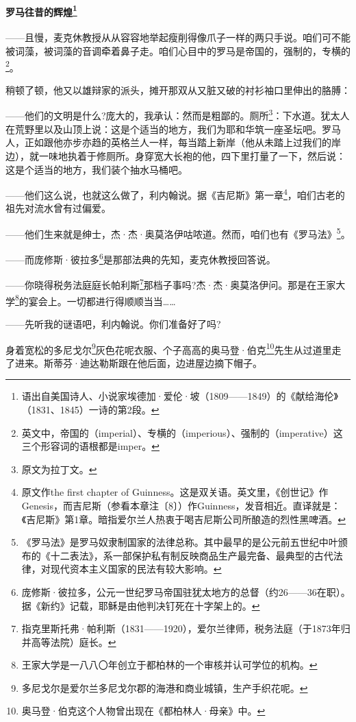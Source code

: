 \paragraph*{罗马往昔的辉煌\footnote{语出自美国诗人、小说家埃德加·爱伦·坡（1809——1849）的《献给海伦》（1831、1845）一诗的第2段。}}
\par ——且慢，麦克休教授从从容容地举起瘦削得像爪子一样的两只手说。咱们可不能被词藻，被词藻的音调牵着鼻子走。咱们心目中的罗马是帝国的，强制的，专横的\footnote{英文中，帝国的（imperial）、专横的（imperious）、强制的（imperative）这三个形容词的语根都是imper。}。
\par 稍顿了顿，他又以雄辩家的派头，摊开那双从又脏又破的衬衫袖口里伸出的胳膊：
\par ——他们的文明是什么?庞大的，我承认：然而是粗鄙的。厕所\footnote{原文为拉丁文。}：下水道。犹太人在荒野里以及山顶上说：这是个适当的地方，我们为耶和华筑一座圣坛吧。罗马人，正如跟他亦步亦趋的英格兰人一样，每当踏上新岸（他从未踏上过我们的岸边），就一味地执着于修厕所。身穿宽大长袍的他，四下里打量了一下，然后说：这是个适当的地方，我们装个抽水马桶吧。
\par ——他们这么说，也就这么做了，利内翰说。据《吉尼斯》第一章\footnote{原文作the first chapter of Guinness。这是双关语。英文里，《创世记》作Genesis，而吉尼斯（参看本章注〔8〕）作Guinness，发音相近。直译就是：《吉尼斯》第1章。暗指爱尔兰人热衷于喝吉尼斯公司所酿造的烈性黑啤酒。}，咱们古老的祖先对流水曾有过偏爱。
\par ——他们生来就是绅士，杰·杰·奥莫洛伊咕哝道。然而，咱们也有《罗马法》\footnote{《罗马法》是罗马奴隶制国家的法律总称。其中最早的是公元前五世纪中叶颁布的《十二表法》，系一部保护私有制反映商品生产最完备、最典型的古代法律，对现代资本主义国家的民法有较大影响。}。
\par ——而庞修斯·彼拉多\footnote{庞修斯·彼拉多，公元一世纪罗马帝国驻犹太地方的总督（约26——36在职）。据《新约》记载，耶稣是由他判决钉死在十字架上的。}是那部法典的先知，麦克休教授回答说。
\par ——你晓得税务法庭庭长帕利斯\footnote{指克里斯托弗·帕利斯（1831——1920），爱尔兰律师，税务法庭（于1873年归并高等法院）庭长。}那档子事吗?杰·杰·奥莫洛伊问。那是在王家大学\footnote{王家大学是一八八〇年创立于都柏林的一个审核并认可学位的机构。}的宴会上。一切都进行得顺顺当当……
\par ——先听我的谜语吧，利内翰说。你们准备好了吗?
\par 身着宽松的多尼戈尔\footnote{多尼戈尔是爱尔兰多尼戈尔郡的海港和商业城镇，生产手织花呢。}灰色花呢衣服、个子高高的奥马登·伯克\footnote{奥马登·伯克这个人物曾出现在《都柏林人·母亲》中。}先生从过道里走了进来。斯蒂芬·迪达勒斯跟在他后面，边进屋边摘下帽子。

